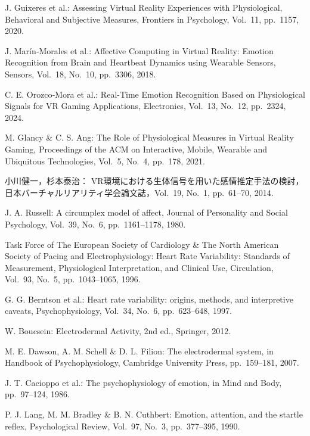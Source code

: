 \documentclass[a4paper]{jarticle}
\begin{document}
\begin{thebibliography}{12}

J. Guixeres et al.: 
Assessing Virtual Reality Experiences with Physiological, Behavioral and Subjective Measures,
Frontiers in Psychology, Vol.~11, pp.~1157, 2020.

J. Marín‑Morales et al.: 
Affective Computing in Virtual Reality: Emotion Recognition from Brain and Heartbeat Dynamics using Wearable Sensors,
Sensors, Vol.~18, No.~10, pp.~3306, 2018.

C. E. Orozco‑Mora et al.: 
Real-Time Emotion Recognition Based on Physiological Signals for VR Gaming Applications,
Electronics, Vol.~13, No.~12, pp.~2324, 2024.

M. Glancy \& C. S. Ang: 
The Role of Physiological Measures in Virtual Reality Gaming,
Proceedings of the ACM on Interactive, Mobile, Wearable and Ubiquitous Technologies, Vol.~5, No.~4, pp.~178, 2021.

小川健一，杉本泰治：
VR環境における生体信号を用いた感情推定手法の検討，
日本バーチャルリアリティ学会論文誌，Vol.~19, No.~1, pp.~61--70, 2014.

J. A. Russell: 
A circumplex model of affect,
Journal of Personality and Social Psychology, Vol.~39, No.~6, pp.~1161--1178, 1980.

Task Force of The European Society of Cardiology \& The North American Society of Pacing and Electrophysiology: 
Heart Rate Variability: Standards of Measurement, Physiological Interpretation, and Clinical Use,
Circulation, Vol.~93, No.~5, pp.~1043--1065, 1996.

G. G. Berntson et al.: 
Heart rate variability: origins, methods, and interpretive caveats,
Psychophysiology, Vol.~34, No.~6, pp.~623--648, 1997.

W. Boucsein: 
Electrodermal Activity, 2nd ed., 
Springer, 2012.

M. E. Dawson, A. M. Schell \& D. L. Filion: 
The electrodermal system, 
in Handbook of Psychophysiology, Cambridge University Press, pp.~159--181, 2007.

J. T. Cacioppo et al.: 
The psychophysiology of emotion,
in Mind and Body, pp.~97--124, 1986.

P. J. Lang, M. M. Bradley \& B. N. Cuthbert: 
Emotion, attention, and the startle reflex,
Psychological Review, Vol.~97, No.~3, pp.~377--395, 1990.

\end{thebibliography}
\end{document}
